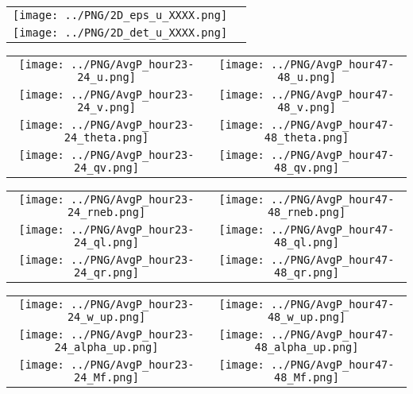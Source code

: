 \documentclass{article}
\begin{document}

\begin{table}
  \begin{tabular}{cc}
     \texttt{[image: ../PNG/2D\_eps\_u\_XXXX.png]} & \\%
     \texttt{[image: ../PNG/2D\_det\_u\_XXXX.png]} & %
  \end{tabular}
\end{table}

\newpage

\begin{table}
  \begin{tabular}{cc}
     \texttt{[image: ../PNG/AvgP\_hour23-24\_u.png]}     & \texttt{[image: ../PNG/AvgP\_hour47-48\_u.png]}     \\
     \texttt{[image: ../PNG/AvgP\_hour23-24\_v.png]}     & \texttt{[image: ../PNG/AvgP\_hour47-48\_v.png]}     \\
     \texttt{[image: ../PNG/AvgP\_hour23-24\_theta.png]} & \texttt{[image: ../PNG/AvgP\_hour47-48\_theta.png]} \\
     \texttt{[image: ../PNG/AvgP\_hour23-24\_qv.png]}    & \texttt{[image: ../PNG/AvgP\_hour47-48\_qv.png]}
  \end{tabular}
\end{table}

\newpage

\begin{table}
  \begin{tabular}{cc}
     \texttt{[image: ../PNG/AvgP\_hour23-24\_rneb.png]} & \texttt{[image: ../PNG/AvgP\_hour47-48\_rneb.png]} \\
     \texttt{[image: ../PNG/AvgP\_hour23-24\_ql.png]}   & \texttt{[image: ../PNG/AvgP\_hour47-48\_ql.png]}  \\
     \texttt{[image: ../PNG/AvgP\_hour23-24\_qr.png]}   & \texttt{[image: ../PNG/AvgP\_hour47-48\_qr.png]}
  \end{tabular}
\end{table}

\newpage

\begin{table}
  \begin{tabular}{cc}
     \texttt{[image: ../PNG/AvgP\_hour23-24\_w\_up.png]}     & \texttt{[image: ../PNG/AvgP\_hour47-48\_w\_up.png]}     \\
     \texttt{[image: ../PNG/AvgP\_hour23-24\_alpha\_up.png]} & \texttt{[image: ../PNG/AvgP\_hour47-48\_alpha\_up.png]} \\
     \texttt{[image: ../PNG/AvgP\_hour23-24\_Mf.png]}       & \texttt{[image: ../PNG/AvgP\_hour47-48\_Mf.png]}
  \end{tabular}
\end{table}
\end{document}
